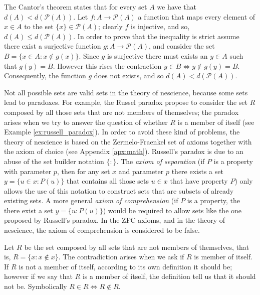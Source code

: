 \begin{example}
\label{cantor_theorem}
The Cantor's theorem states that for every set $A$ we have that $d(A) < d\left(\mathcal{P}(A)\right)$. Let $f: A \rightarrow \mathcal{P}(A)$ a function that maps every element of $x \in A$ to the set $\{x\} \in \mathcal{P}(A)$; clearly $f$ is injective, and so, $d(A) \leq d\left(\mathcal{P}(A)\right)$. In order to prove that the inequality is strict assume there exist a surjective function $g: A \rightarrow \mathcal{P}(A)$, and consider the set $B = \{ x \in A : x \notin g(x) \}$. Since $g$ is surjective there must exists an $y \in A$ such that $g(y) = B$. However this rises the contraction $y \in B \Leftrightarrow y \notin g(y) = B$. Consequently, the function $g$ does not exists, and so $d(A) < d\left(\mathcal{P}(A)\right)$.
\end{example}

Not all possible sets are valid sets in the theory of nescience, because some sets lead to paradoxes. For example, the Russel paradox propose to consider the set $R$ composed by all those sets that are not members of themselves; the paradox arises when we try to answer the question of whether $R$ is a member of itself (see Example \ref{ex:russell_paradox}). In order to avoid these kind of problems, the theory of nescience is based on the Zermelo-Fraenkel set of axioms together with the axiom of choice (see Appendix \ref{apx:math}). Russell's paradox is due to an abuse of the set builder notation $\{ : \}$. The \emph{axiom of separation} (if $P$ is a property with parameter $p$, then for any set $x$ and parameter $p$ there exists a set $y=\{u \in x : P(u) \}$ that contains all those sets $u \in x$ that have property $P$) only allows the use of this notation to construct sets that are subsets of already existing sets. A more general \emph{axiom of comprehension} (if $P$ is a property, the there exist a set $y=\{u : P(u) \}$) would be required to allow sets like the one proposed by Russell's paradox. In the ZFC axioms, and in the theory of nescience, the axiom of comprehension is considered to be false.

\begin{example}
\label{ex:russell_paradox}
Let $R$ be the set composed by all sets that are not members of themselves, that is, $R = \{ x : x \notin x \}$. The contradiction arises when we ask if $R$ is member of itself. If $R$ is not a member of itself, according to its own definition it should be; however if we say that $R$ is a member of itself, the definition tell us that it should not be. Symbolically $R \in R \Leftrightarrow R \notin R$.
\end{example}

